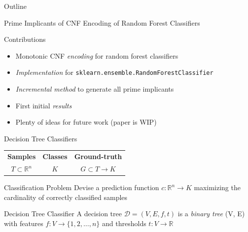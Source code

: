 \documentclass[t]{sdqbeamer}
\begin{document}
\begin{frame}{Outline}

Prime Implicants of CNF Encoding of Random Forest Classifiers

\bigskip

\begin{block}{Contributions}

\begin{itemize}\setlength\itemsep{1em}
\item Monotonic CNF \emph{encoding} for random forest classifiers
\item \emph{Implementation} for \texttt{sklearn.ensemble.RandomForestClassifier}
\item \emph{Incremental method} to generate all prime implicants
\item First initial \emph{results}
\item Plenty of ideas for future work (paper is WIP)
\end{itemize}

\end{block}

\end{frame}


\begin{frame}{Decision Tree Classifiers}


\begin{tabular}{ccc}
	\bf Samples & \bf Classes & \bf Ground-truth\\[.5em]
	$T \subset \mathbb{R}^n$ & $K$ & $G \subset T \rightarrow K$\\
\end{tabular}

\begin{block}{Classification Problem}
Devise a prediction function $c : \mathbb{R}^n \rightarrow K$ maximizing the cardinality of correctly classified samples
\end{block}

\begin{alertblock}{Decision Tree Classifier}
A decision tree $\mathcal{D} = (V, E, f, t)$ is a \emph{binary tree} (V, E) with features $f : V \rightarrow \{1, 2, \dots, n\}$ and thresholds $t : V \rightarrow \mathbb{R}$
\end{alertblock}

\end{frame}
\end{document}
